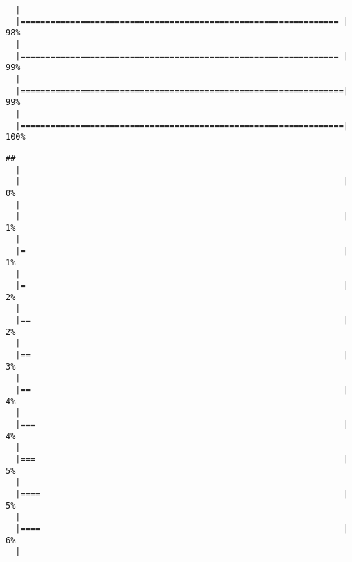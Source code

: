\begin{knitrout}
\begin{kframe}
\begin{verbatim}
  |                                                                       
  |================================================================ |  98%
  |                                                                       
  |================================================================ |  99%
  |                                                                       
  |=================================================================|  99%
  |                                                                       
  |=================================================================| 100%
\end{verbatim}
\begin{alltt}
 \hlkwb{<-} 
\end{alltt}
\begin{verbatim}
## 
  |                                                                       
  |                                                                 |   0%
  |                                                                       
  |                                                                 |   1%
  |                                                                       
  |=                                                                |   1%
  |                                                                       
  |=                                                                |   2%
  |                                                                       
  |==                                                               |   2%
  |                                                                       
  |==                                                               |   3%
  |                                                                       
  |==                                                               |   4%
  |                                                                       
  |===                                                              |   4%
  |                                                                       
  |===                                                              |   5%
  |                                                                       
  |====                                                             |   5%
  |                                                                       
  |====                                                             |   6%
  |                                                                       

\end{verbatim}
\end{kframe}
\end{knitrout}
